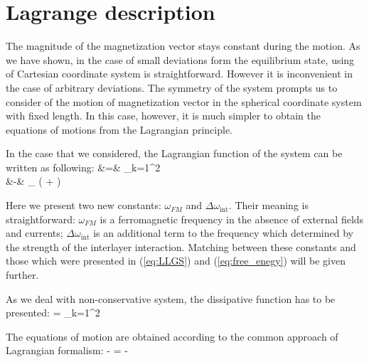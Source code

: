 \newpage

\section{Lagrange description}

The magnitude of the magnetization vector stays constant during the motion. As we have shown, in the case of small deviations form the equilibrium state, using of Cartesian coordinate system is straightforward. However it is inconvenient in the case of arbitrary deviations. The symmetry of the system prompts us to consider of the motion of magnetization vector in the spherical coordinate system with fixed length. In this case, however, it is much simpler to obtain the equations of motions from the Lagrangian principle.

In the case that we considered, the Lagrangian function of the system can be written as following:
\bea
\label{eq:Lagrangian}
	 &=&	 \sum_{k=1}^2
					\\
				&-&  \Delta \omega_
					\left(
						 
						+  
					\right)
\eea

Here we present two new constants: $\omega_{FM}$ and $\Delta \omega_\text{int}$. Their meaning is straightforward: $\omega_{FM}$ is a ferromagnetic frequency in the absence of external fields and currents; $\Delta \omega_\text{int}$ is an additional term to the frequency which determined by the strength of the interlayer interaction. Matching between these constants and those which were presented in (\ref{eq:LLGS}) and (\ref{eq:free_enegy}) will be given further.

As we deal with non-conservative system, the dissipative function has to be presented:
\bea
\label{eq:dissipative_function}
	 =  \sum_{k=1}^2
\eea

The equations of motion are obtained according to the common approach of Lagrangian formalism:
\be
\label{eq:Lagrange_equation}
	 -  =
	-
\ee




